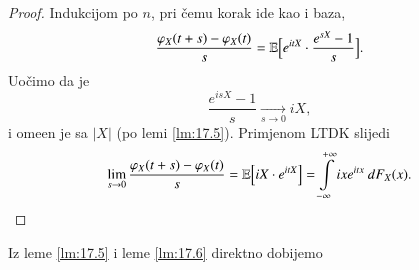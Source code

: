 \begin{proof}
    Indukcijom po $n$, pri \v cemu korak ide kao i baza,
    \begin{equation*}
        \frac{\varphi_X (t + s) - \varphi_X (t)}{s} = \mathbb{E} \Big[ e^{i t X} \cdot \frac{e^{s X} - 1}{s} \Big].
    \end{equation*}
    Uo\v cimo da je
    \begin{equation*}
        \frac{e^{i s X} - 1}{s} \xrightarrow[s \to 0]{} i X,
    \end{equation*}
    i ome\dj en je sa $|X|$ (po lemi \ref{lm:17.5}).
    Primjenom LTDK slijedi
    \begin{equation*}
        \lim\limits_{s \to 0} \frac{\varphi_X (t + s) - \varphi_X (t)}{s} = \mathbb{E} \Big[ i X \cdot e^{i t X} \Big] = \int\limits_{-\infty}^{+\infty} i x e^{i t x} \: d F_X (x).
    \end{equation*}
\end{proof}

Iz leme \ref{lm:17.5} i leme \ref{lm:17.6} direktno dobijemo

